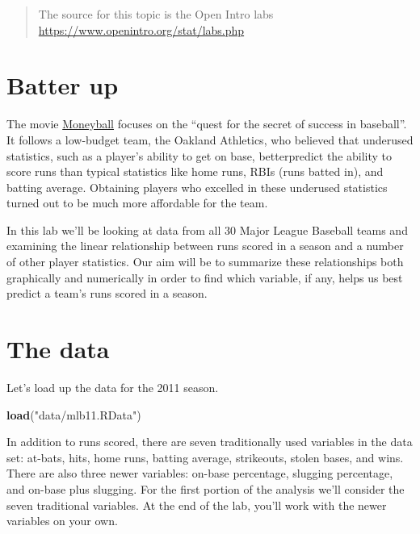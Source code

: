 \documentclass[]{book}
\newenvironment{Shaded}{\begin{snugshade}}{\end{snugshade}}
\newcommand{\KeywordTok}[1]{\textcolor[rgb]{0.13,0.29,0.53}{\textbf{{#1}}}}
\newcommand{\StringTok}[1]{\textcolor[rgb]{0.31,0.60,0.02}{{#1}}}
\newcommand{\NormalTok}[1]{{#1}}
\theoremstyle{definition}
\theoremstyle{definition}
\theoremstyle{remark}
\begin{document}
\begin{quote}
The source for this topic is the Open Intro labs
\url{https://www.openintro.org/stat/labs.php}
\end{quote}

\section*{Batter up}\label{batter-up}

The movie
\href{http://en.wikipedia.org/wiki/Moneyball_(film)}{Moneyball} focuses
on the ``quest for the secret of success in baseball''. It follows a
low-budget team, the Oakland Athletics, who believed that underused
statistics, such as a player's ability to get on base, betterpredict the
ability to score runs than typical statistics like home runs, RBIs (runs
batted in), and batting average. Obtaining players who excelled in these
underused statistics turned out to be much more affordable for the team.

In this lab we'll be looking at data from all 30 Major League Baseball
teams and examining the linear relationship between runs scored in a
season and a number of other player statistics. Our aim will be to
summarize these relationships both graphically and numerically in order
to find which variable, if any, helps us best predict a team's runs
scored in a season.

\section*{The data}\label{the-data-4}

Let's load up the data for the 2011 season.

\begin{Shaded}
\begin{Highlighting}[]
\KeywordTok{load}\NormalTok{(}\StringTok{"data/mlb11.RData"}\NormalTok{)}
\end{Highlighting}
\end{Shaded}

In addition to runs scored, there are seven traditionally used variables
in the data set: at-bats, hits, home runs, batting average, strikeouts,
stolen bases, and wins. There are also three newer variables: on-base
percentage, slugging percentage, and on-base plus slugging. For the
first portion of the analysis we'll consider the seven traditional
variables. At the end of the lab, you'll work with the newer variables
on your own.
\end{document}
